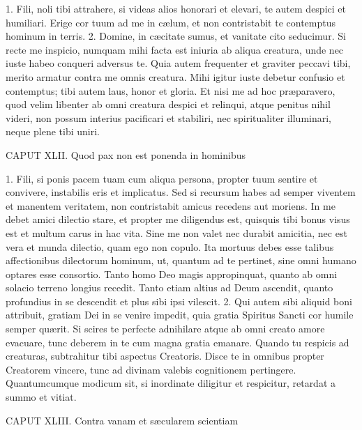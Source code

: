 \documentclass[twoside]{article}
\begin{document}
1. Fili, noli tibi attrahere, si videas alios honorari et elevari, te autem despici et humiliari. Erige cor tuum ad me in cælum, et non contristabit te contemptus hominum in terris.
2. Domine, in cæcitate sumus, et vanitate cito seducimur. Si recte me inspicio, numquam mihi facta est iniuria ab aliqua creatura, unde nec iuste habeo conqueri adversus te. Quia autem frequenter et graviter peccavi tibi, merito armatur contra me omnis creatura. Mihi igitur iuste debetur confusio et contemptus; tibi autem laus, honor et gloria. Et nisi me ad hoc præparavero, quod velim libenter ab omni creatura despici et relinqui, atque penitus nihil videri, non possum interius pacificari et stabiliri, nec spiritualiter illuminari, neque plene tibi uniri.


CAPUT XLII.
Quod pax non est ponenda in hominibus

1. Fili, si ponis pacem tuam cum aliqua persona, propter tuum sentire et convivere, instabilis eris et implicatus. Sed si recursum habes ad semper viventem et manentem veritatem, non contristabit amicus recedens aut moriens. In me debet amici dilectio stare, et propter me diligendus est, quisquis tibi bonus visus est et multum carus in hac vita. Sine me non valet nec durabit amicitia, nec
est vera et munda dilectio, quam ego non copulo. Ita mortuus debes esse talibus affectionibus dilectorum hominum, ut, quantum ad te pertinet, sine omni humano optares esse consortio. Tanto homo Deo magis appropinquat, quanto ab omni solacio terreno longius recedit. Tanto etiam altius ad Deum ascendit, quanto profundius in se descendit et plus sibi ipsi vilescit.
2. Qui autem sibi aliquid boni attribuit, gratiam Dei in se venire impedit, quia gratia Spiritus Sancti cor humile semper quærit. Si scires te perfecte adnihilare atque ab omni creato amore evacuare, tunc deberem in te cum magna gratia emanare. Quando tu respicis ad creaturas, subtrahitur tibi aspectus Creatoris. Disce te in omnibus propter Creatorem vincere, tunc ad divinam valebis cognitionem pertingere. Quantumcumque modicum sit, si inordinate diligitur et respicitur, retardat a summo et vitiat.


CAPUT XLIII.
Contra vanam et sæcularem scientiam
\end{document}
